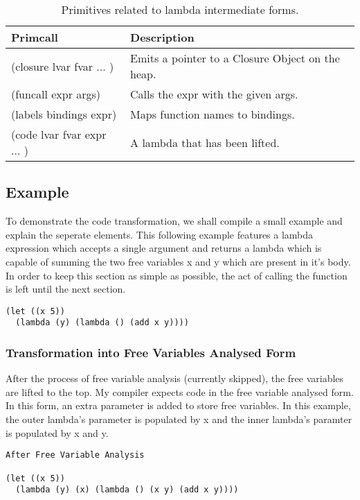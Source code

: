 \documentclass{article}
\begin{document}
\begin{table}[ht]
  \centering
\begin{tabular}{ l l }
  \toprule
  Primcall & Description \\ \hline
  \midrule
  (closure lvar fvar ... ) & Emits a pointer to a Closure Object on the heap.  \\
  (funcall expr args) & Calls the expr with the given args.  \\
  (labels bindings expr) & Maps function names to bindings. \\
  (code lvar fvar expr ... ) & A lambda that has been lifted.  \\
  \bottomrule
\end{tabular}
\caption{Primitives related to lambda intermediate forms.} \label{tab:lambda_intermediate}
\end{table}

\subsection{Example}

To demonstrate the code transformation, we shall compile a small example and explain the seperate elements. This following example features a lambda expression which accepts a single argument and returns a lambda which is capable of summing the two free variables x and y which are present in it's body. In order to keep this section as simple as possible, the act of calling the function is left until the next section.

\begin{verbatim}
(let ((x 5))
  (lambda (y) (lambda () (add x y))))
\end{verbatim}

\subsubsection{Transformation into Free Variables Analysed Form}

After the process of free variable analysis (currently skipped), the free variables are lifted to the top. My compiler expects code in the free variable analysed form. In this form, an extra parameter is added to store free variables. In this example, the outer lambda's parameter is populated by x and the inner lambda's paramter is populated by x and y. 

\begin{verbatim}
After Free Variable Analysis

(let ((x 5))
  (lambda (y) (x) (lambda () (x y) (add x y))))
\end{verbatim}
\end{document}
